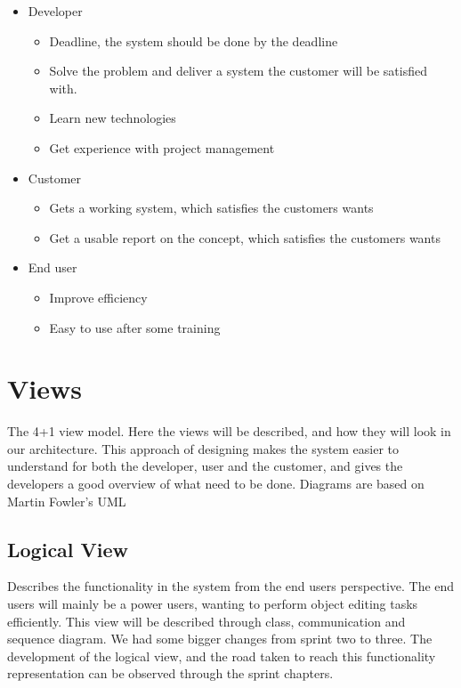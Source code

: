 \begin{itemize}
    \item Developer
    \begin{itemize}
        \item Deadline, the system should be done by the deadline
        \item Solve the problem and deliver a system the customer will be satisfied with.
        \item Learn new technologies
        \item Get experience with project management
        \end{itemize}
    \item Customer
    \begin{itemize}
        \item Gets a working system, which satisfies the customers wants
        \item Get a usable report on the concept, which satisfies the customers wants
    \end{itemize}
    \item End user
    \begin{itemize}
        \item Improve efficiency
        \item Easy to use after some training
    \end{itemize}
\end{itemize}



\section{Views} \label{Views}
The 4+1 view model\cite{Kruchten}. Here the views will be described, and how they will look in our architecture. This approach of designing makes the system easier to understand for both the developer, user and the customer, and gives the developers a good overview of what need to be done. Diagrams are based on Martin Fowler's UML\cite{Fowl04}

\subsection{Logical View}
Describes the functionality in the system from the end users perspective. The end users will mainly be a power users, wanting to perform object editing tasks efficiently. This view will be described through class, communication and sequence diagram.  We had some bigger changes from sprint two to three. The development of the logical view, and the road taken to reach this functionality representation can be observed through the sprint chapters.

